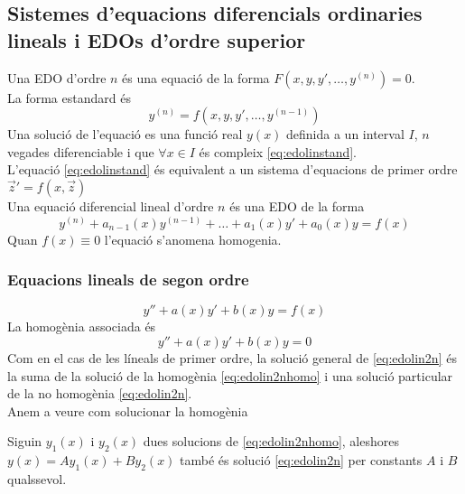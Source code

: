 \documentclass[../main.tex]{subfiles}
\begin{document}
\subsection{Sistemes d'equacions diferencials ordinaries lineals i EDOs d'ordre superior}
Una EDO d'ordre $n$ és una equació de la forma $F(x, y, y', \ldots, y^{(n)}) = 0$.\\
La forma estandard és
\begin{equation}
	y^{(n)} = f(x, y, y', \ldots, y^{(n-1)})
	\label{eq:edolinstand}
\end{equation}
Una solució de l'equació es una funció real $y(x)$ definida a un interval $I$, $n$ vegades diferenciable i que $\forall x \in I$ és compleix \eqref{eq:edolinstand}.\\
L'equació \eqref{eq:edolinstand} és equivalent a un sistema d'equacions de primer ordre $\vec{z}' = f(x, \vec{z})$\\
Una equació diferencial lineal d'ordre $n$ és una EDO de la forma
\begin{displaymath}
	y^{(n)} + a_{n-1}(x)y^{(n-1)} + \ldots + a_1(x)y' + a_0(x)y = f(x)
\end{displaymath}
Quan $f(x)\equiv0$ l'equació s'anomena homogenia.\\
\subsubsection{Equacions lineals de segon ordre}
\begin{equation}
	y'' + a(x)y' + b(x)y = f(x)
	\label{eq:edolin2n}
\end{equation}
La homogènia associada és
\begin{equation}
	y'' + a(x)y' + b(x)y = 0\label{eq:edolin2nhomo}
\end{equation}
Com en el cas de les líneals de primer ordre, la solució general de \eqref{eq:edolin2n} és la suma de la solució de la homogènia \eqref{eq:edolin2nhomo} i una solució particular de la no homogènia \eqref{eq:edolin2n}.\\
Anem a veure com solucionar la homogènia
\begin{proposicio}
	Siguin $y_1(x)$ i $y_2(x)$ dues solucions de \eqref{eq:edolin2nhomo}, aleshores $y(x) = Ay_1(x) + By_2(x)$ també és solució \eqref{eq:edolin2n} per constants $A$ i $B$ qualssevol.
\end{proposicio}
\end{document}
